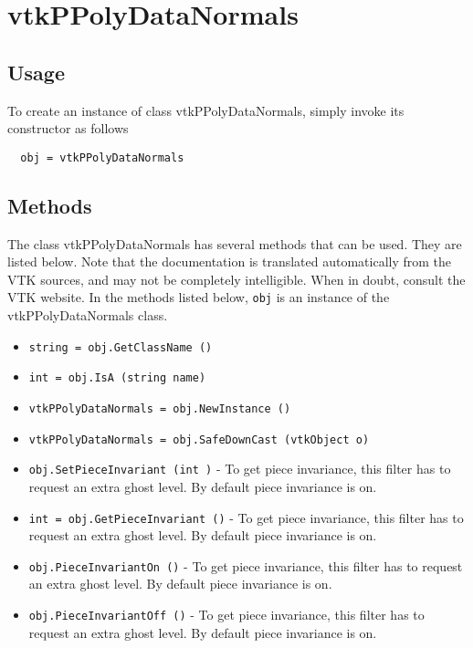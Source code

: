 \section{vtkPPolyDataNormals}

\subsection{Usage}


To create an instance of class vtkPPolyDataNormals, simply
invoke its constructor as follows
\begin{verbatim}
  obj = vtkPPolyDataNormals
\end{verbatim}
\subsection{Methods}

The class vtkPPolyDataNormals has several methods that can be used.
  They are listed below.
Note that the documentation is translated automatically from the VTK sources,
and may not be completely intelligible.  When in doubt, consult the VTK website.
In the methods listed below, \verb|obj| is an instance of the vtkPPolyDataNormals class.
\begin{itemize}
\item  \verb|string = obj.GetClassName ()|

\item  \verb|int = obj.IsA (string name)|

\item  \verb|vtkPPolyDataNormals = obj.NewInstance ()|

\item  \verb|vtkPPolyDataNormals = obj.SafeDownCast (vtkObject o)|

\item  \verb|obj.SetPieceInvariant (int )| -  To get piece invariance, this filter has to request an 
 extra ghost level.  By default piece invariance is on.

\item  \verb|int = obj.GetPieceInvariant ()| -  To get piece invariance, this filter has to request an 
 extra ghost level.  By default piece invariance is on.

\item  \verb|obj.PieceInvariantOn ()| -  To get piece invariance, this filter has to request an 
 extra ghost level.  By default piece invariance is on.

\item  \verb|obj.PieceInvariantOff ()| -  To get piece invariance, this filter has to request an 
 extra ghost level.  By default piece invariance is on.

\end{itemize}
